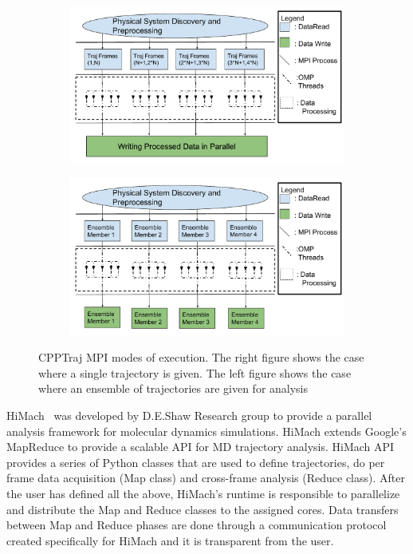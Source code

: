 \begin{figure}[t]
		\begin{subfigure}{.5\textwidth}
		\centering
		\includegraphics[width=.95\textwidth]{figures/CPPTrajExecutionSchematicSingleTrajectory.pdf}
	\end{subfigure}
	\begin{subfigure}{.5\textwidth}
		\centering
		\includegraphics[width=.95\linewidth]{figures/CPPTrajExecutionSchematicEnsembleTrajectories.pdf}
	\end{subfigure}
	\caption{CPPTraj MPI modes of execution. The right figure shows the case where a single trajectory is
		given. The left figure shows the case where an ensemble of trajectories are given for analysis}
	\label{fig:cpptraj_arch}
\end{figure}

HiMach~\cite{himach-2008} was developed by D.E.Shaw Research group to provide a parallel analysis
framework for molecular dynamics simulations. HiMach extends Google's MapReduce
to provide a scalable API for MD trajectory analysis. HiMach API provides a series
of Python classes that are used to define trajectories, do per frame data acquisition
(Map class) and cross-frame analysis (Reduce class). After the user has defined all 
the above, HiMach's runtime is responsible to parallelize and distribute the Map and 
Reduce classes to the assigned cores. Data transfers between Map and Reduce phases are
done through a communication protocol created specifically for HiMach and it is transparent
from the user.